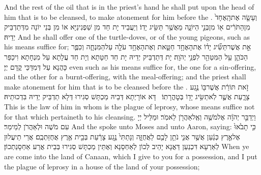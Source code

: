 {And the rest of the oil that is in the priest’s hand he shall put upon the head of him that is to be cleansed, to make atonement for him before the \lord.}{}
{וְעָשָׂ֤ה אֶת\maqqaf הָֽאֶחָד֙ מִן\maqqaf הַתֹּרִ֔ים א֖וֹ מִן\maqqaf בְּנֵ֣י הַיּוֹנָ֑ה מֵאֲשֶׁ֥ר תַּשִּׂ֖יג יָדֽוֹ׃}
{וְיַעֲבֵיד יָת חַד מִן שַׁפְנִינַיָּא אוֹ מִן בְּנֵי יוֹנָה מִדְּתַדְבֵּיק יְדֵיהּ׃}
{And he shall offer one of the turtle-doves, or of the young pigeons, such as his means suffice for;}{}
{אֵ֣ת אֲשֶׁר\maqqaf תַּשִּׂ֞יג יָד֗וֹ אֶת\maqqaf הָאֶחָ֥ד חַטָּ֛את וְאֶת\maqqaf הָאֶחָ֥ד עֹלָ֖ה עַל\maqqaf הַמִּנְחָ֑ה וְכִפֶּ֧ר הַכֹּהֵ֛ן עַ֥ל הַמִּטַּהֵ֖ר לִפְנֵ֥י יְהֹוָֽה׃}
{יָת דְּתַדְבֵּיק יְדֵיהּ יָת חַד חַטָּתָא וְיָת חַד עֲלָתָא עַל מִנְחָתָא וִיכַפַּר כָּהֲנָא עַל דְּמִדַּכֵּי קֳדָם יְיָ׃}
{even such as his means suffice for, the one for a sin-offering, and the other for a burnt-offering, with the meal-offering; and the priest shall make atonement for him that is to be cleansed before the \lord.}{}
{זֹ֣את תּוֹרַ֔ת אֲשֶׁר\maqqaf בּ֖וֹ נֶ֣גַע צָרָ֑עַת אֲשֶׁ֛ר לֹֽא\maqqaf תַשִּׂ֥יג יָד֖וֹ בְּטׇהֳרָתֽוֹ׃ \petucha }
{דָּא אוֹרָיְתָא דְּבֵיהּ מַכְתָּשׁ סְגִירוּ דְּלָא תַדְבֵּיק יְדֵיהּ בִּדְכוּתֵיהּ׃}
{This is the law of him in whom is the plague of leprosy, whose means suffice not for that which pertaineth to his cleansing.}{}
{וַיְדַבֵּ֣ר יְהֹוָ֔ה אֶל\maqqaf מֹשֶׁ֥ה וְאֶֽל\maqqaf אַהֲרֹ֖ן לֵאמֹֽר׃}
{וּמַלֵּיל יְיָ עִם מֹשֶׁה וּלְאַהֲרֹן לְמֵימַר׃}
{And the \lord\space spoke unto Moses and unto Aaron, saying:}{}
{כִּ֤י תָבֹ֙אוּ֙ אֶל\maqqaf אֶ֣רֶץ כְּנַ֔עַן אֲשֶׁ֥ר אֲנִ֛י נֹתֵ֥ן לָכֶ֖ם לַאֲחֻזָּ֑ה וְנָתַתִּי֙ נֶ֣גַע צָרַ֔עַת בְּבֵ֖ית אֶ֥רֶץ אֲחֻזַּתְכֶֽם׃}
{אֲרֵי תֵיעֲלוּן לְאַרְעָא דִּכְנַעַן דַּאֲנָא יָהֵיב לְכוֹן לְאַחְסָנָא וְאֶתֵּין מַכְתָּשׁ סְגִירוּ בְּבֵית אֲרַע אַחְסָנַתְכוֹן׃}
{When ye are come into the land of Canaan, which I give to you for a possession, and I put the plague of leprosy in a house of the land of your possession;}{}
